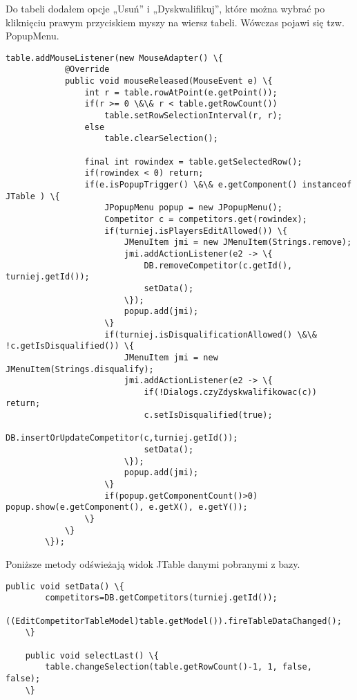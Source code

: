 Do tabeli dodałem opcje „Usuń” i „Dyskwalifikuj”, które można wybrać po kliknięciu prawym przyciskiem myszy na wiersz tabeli. Wówczas pojawi się tzw. PopupMenu.
\begin{verbatim}
table.addMouseListener(new MouseAdapter() \{
            @Override
            public void mouseReleased(MouseEvent e) \{
                int r = table.rowAtPoint(e.getPoint());
                if(r >= 0 \&\& r < table.getRowCount()) 
                    table.setRowSelectionInterval(r, r);
                else 
                	table.clearSelection();

                final int rowindex = table.getSelectedRow();
                if(rowindex < 0) return;
                if(e.isPopupTrigger() \&\& e.getComponent() instanceof JTable ) \{
                    JPopupMenu popup = new JPopupMenu();
					Competitor c = competitors.get(rowindex);
                    if(turniej.isPlayersEditAllowed()) \{
                        JMenuItem jmi = new JMenuItem(Strings.remove);
                        jmi.addActionListener(e2 -> \{
							DB.removeCompetitor(c.getId(), turniej.getId());
							setData();
						\});
	                    popup.add(jmi);
                    \}
                    if(turniej.isDisqualificationAllowed() \&\& !c.getIsDisqualified()) \{
                        JMenuItem jmi = new JMenuItem(Strings.disqualify);
                    	jmi.addActionListener(e2 -> \{
                    		if(!Dialogs.czyZdyskwalifikowac(c)) return;		
							c.setIsDisqualified(true);
							DB.insertOrUpdateCompetitor(c,turniej.getId());
							setData();
                    	\});
	                    popup.add(jmi);
                    \}
                    if(popup.getComponentCount()>0) popup.show(e.getComponent(), e.getX(), e.getY());
                \}
            \}
        \});
\end{verbatim}

Poniższe metody odświeżają widok JTable danymi pobranymi z bazy.
\begin{verbatim}
public void setData() \{
		competitors=DB.getCompetitors(turniej.getId());
		((EditCompetitorTableModel)table.getModel()).fireTableDataChanged();     
	\}
	
	public void selectLast() \{
		table.changeSelection(table.getRowCount()-1, 1, false,  false);
	\}
\end{verbatim}

